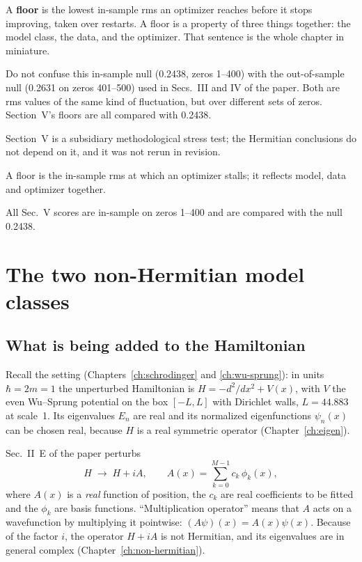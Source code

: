 A \textbf{floor} is the lowest in-sample rms an optimizer reaches before it stops improving, taken over restarts. A floor is a property of three things together: the model class, the data, and the optimizer. That sentence is the whole chapter in miniature.

\begin{pitfall}
Do not confuse this in-sample null (0.2438, zeros 1--400) with the out-of-sample null (0.2631 on zeros 401--500) used in Secs.~III and IV of the paper. Both are rms values of the same kind of fluctuation, but over different sets of zeros. Section~V's floors are all compared with 0.2438.
\end{pitfall}

\begin{keyideas}
\item Section~V is a subsidiary methodological stress test; the Hermitian conclusions do not depend on it, and it was not rerun in revision.
\item A floor is the in-sample rms at which an optimizer stalls; it reflects model, data and optimizer together.
\item All Sec.~V scores are in-sample on zeros 1--400 and are compared with the null 0.2438.
\end{keyideas}

\section{The two non-Hermitian model classes}\label{sec:paper-spurious-floor-classes}

\subsection{What is being added to the Hamiltonian}

Recall the setting (Chapters~\ref{ch:schrodinger} and \ref{ch:wu-sprung}): in units $\hbar=2m=1$ the unperturbed Hamiltonian is $H=-d^2/dx^2+V(x)$, with $V$ the even Wu--Sprung potential on the box $[-L,L]$ with Dirichlet walls, $L=44.883$ at scale~1. Its eigenvalues $E_n$ are real and its normalized eigenfunctions $\psi_n(x)$ can be chosen real, because $H$ is a real symmetric operator (Chapter~\ref{ch:eigen}).

Sec.~II~E of the paper perturbs
\begin{equation}
H\;\to\;H+iA,\qquad A(x)=\sum_{k=0}^{M-1}c_k\,\phi_k(x),\label{eq:paper-spurious-floor-HiA}
\end{equation}
where $A(x)$ is a \emph{real} function of position, the $c_k$ are real coefficients to be fitted and the $\phi_k$ are basis functions. ``Multiplication operator'' means that $A$ acts on a wavefunction by multiplying it pointwise: $(A\psi)(x)=A(x)\psi(x)$. Because of the factor $i$, the operator $H+iA$ is not Hermitian, and its eigenvalues are in general complex (Chapter~\ref{ch:non-hermitian}).

